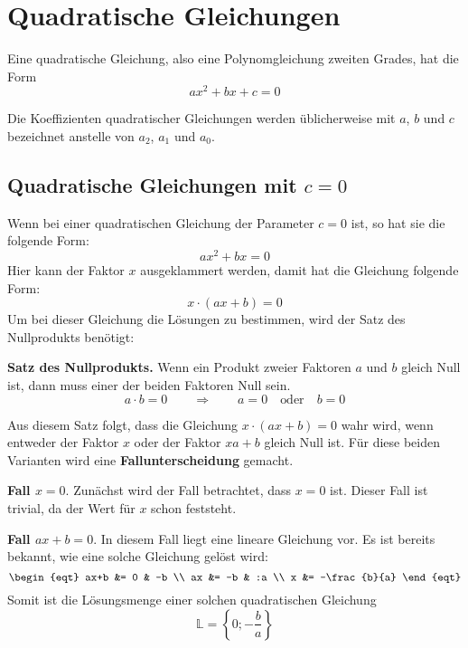 \newpage
\section{Quadratische Gleichungen}

Eine quadratische Gleichung, also eine Polynomgleichung zweiten Grades, hat die Form
\[
  ax^{2}+bx+c = 0
\]

Die Koeffizienten quadratischer Gleichungen werden üblicherweise mit $a$, $b$ und $c$ bezeichnet anstelle von $a_{2}$, $a_{1}$ und $a_{0}$.

\subsection{Quadratische Gleichungen mit $c=0$}

Wenn bei einer quadratischen Gleichung der Parameter $c = 0$ ist, so hat sie die folgende Form:
\[
  ax^{2} + bx = 0
\]
Hier kann der Faktor $x$ ausgeklammert werden, damit hat die Gleichung folgende Form:
\[
  x\cdot(ax+b) = 0
\]
Um bei dieser Gleichung die Lösungen zu bestimmen, wird der Satz des Nullprodukts benötigt:

\begin{theorem}
  \textbf{Satz des Nullprodukts.} Wenn ein Produkt zweier Faktoren $a$ und $b$ gleich Null ist, dann muss einer der beiden Faktoren Null sein.
  \[
    a\cdot b = 0 \qquad\Rightarrow\qquad a = 0 \quad\text{oder}\quad b = 0
  \]
\end{theorem}

Aus diesem Satz folgt, dass die Gleichung $x\cdot(ax+b) = 0$ wahr wird, wenn entweder der Faktor $x$ oder der Faktor $xa+b$ gleich Null ist. Für diese beiden Varianten wird eine \textbf{Fallunterscheidung} gemacht.

\textbf{Fall $x = 0$}. Zunächst wird der Fall betrachtet, dass $x = 0$ ist. Dieser Fall ist trivial, da der Wert für $x$ schon feststeht.

\textbf{Fall $ax+b = 0$}. In diesem Fall liegt eine lineare Gleichung vor. Es ist bereits bekannt, wie eine solche Gleichung gelöst wird:
\[\begin{eqt}
  ax+b &= 0            & -b \\
    ax &= -b           & :a \\
     x &= -\frac{b}{a}
\end{eqt}\]
Somit ist die Lösungsmenge einer solchen quadratischen Gleichung
\[
  \mathbb{L} = \left\{0;-\frac{b}{a}\right\}
\]


